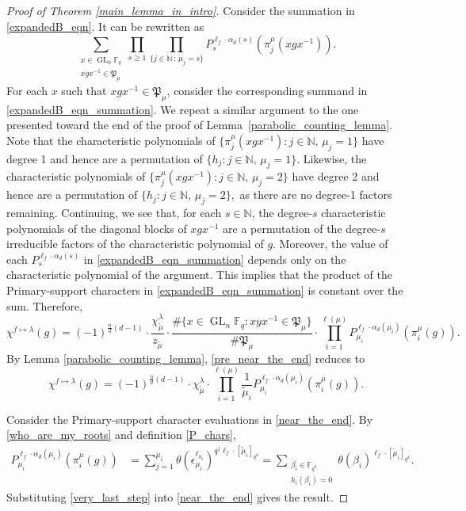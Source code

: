 \documentclass[Unicode,ALCO]{cedram}
\DeclareMathOperator{\GL}{GL}
\newcommand{\F}{\mathbb{F}}
\newcommand{\N}{\mathbb{N}}
\newcommand{\eps}{\epsilon}
\newcommand{\para}{\mathfrak{P}}
\newcommand{\te}{\theta}
\begin{document}
\begin{proof}[Proof of Theorem \ref{main_lemma_in_intro}]
Consider the summation in \eqref{expandedB_eqn}.
It can be rewritten as
\begin{equation}
\label{expandedB_eqn_summation}
\sum_{\substack{x \in \GL_n \F_q \\ xgx^{-1} \in \para_\mu}}
\prod_{s \geq 1}
\prod_{\{j \in \N \, : \, \mu_j = s\}}
P_s^{\ell_f \cdot \alpha_d(s)}
(\pi_j^\mu (xgx^{-1})).
\end{equation}
For each $x$ such that $xgx^{-1} \in \para_\mu$, consider the corresponding summand in \eqref{expandedB_eqn_summation}.
We repeat a similar argument to the one presented toward the end of the proof of Lemma~\ref{parabolic_counting_lemma}.
Note that the characteristic polynomials of
\(
\{\pi_{j}^\mu (xgx^{-1})
: j \in \N, \, \mu_j = 1\}\)
have degree 1 and hence are a permutation of
\(
\{h_j : j \in \N, \, \mu_j = 1\}.
\)
Likewise, the characteristic polynomials of
\(
\{\pi_{j}^\mu (xgx^{-1}) : j \in \N, \, \mu_j = 2\}\)
have degree 2 and hence are a permutation of
\(
\{h_j : j \in \N, \, \mu_j = 2\},
\)
as there are no degree-1 factors remaining.
Continuing, we see that, for each \(s \in \N\), the degree-\(s\) characteristic polynomials of the diagonal blocks of \(xgx^{-1}\) are a permutation of the degree-\(s\) irreducible factors of the characteristic polynomial of \(g\).
Moreover, the value of each \(P_s^{\ell_f \cdot \alpha_d(s)}\) in \eqref{expandedB_eqn_summation} depends only on the characteristic polynomial of the argument.
This implies that the product of the Primary-support characters in \eqref{expandedB_eqn_summation} is constant over the sum.
Therefore,
\begin{equation}
\label{pre_near_the_end}
\chi^{f \mapsto \lambda} (g) = (-1)^{\tfrac{n}{d} (d-1)} \cdot \frac{\chi^\lambda_{\tilde{\mu}}}{z_{\tilde{\mu}}} \cdot \frac{\# \{x \in \GL_n \F_q : xyx^{-1} \in \para_\mu \} }{\# \para_{\mu}} \cdot \prod_{i = 1}^{\ell(\mu)} P_{\mu_i}^{\ell_f \cdot \alpha_d (\mu_i)} (\pi^\mu_i (g)).
\end{equation}
By Lemma \ref{parabolic_counting_lemma}, \eqref{pre_near_the_end} reduces to
\begin{equation}
\label{near_the_end}
\chi^{f \mapsto \lambda} (g) = (-1)^{\tfrac{n}{d}(d-1)} \cdot
\chi^\lambda_{\tilde{\mu}}
\cdot
\prod_{i = 1}^{\ell(\mu)}
\frac{1}{\tilde{\mu}_i}
P_{\mu_i}^{\ell_f \cdot \alpha_d (\mu_i)} (\pi^\mu_i(g)).
\end{equation}

Consider the Primary-support character evaluations in \eqref{near_the_end}.
By \eqref{who_are_my_roots} and definition \eqref{P_chars},
\begin{align}
P_{\mu_i}^{\ell_f \cdot \alpha_d (\mu_i)} (\pi^\mu_i (g))
& = \sum_{j = 1}^{\mu_i} \te(\eps_{\mu_i}^{\ell_{h_i}})^{q^j \ell_f \cdot [\tilde{\mu}_i]_{q^d}}
= \sum_{\substack{\beta_i \in \F_{q^{\mu_i}} \\ h_i( \beta_i) = 0}} \te ( \beta_i )^{\ell_f \cdot [\tilde{\mu}_i]_{q^d}}. \label{very_last_step}
\end{align}
Substituting \eqref{very_last_step} into \eqref{near_the_end}
gives the result.
\end{proof}
\end{document}
